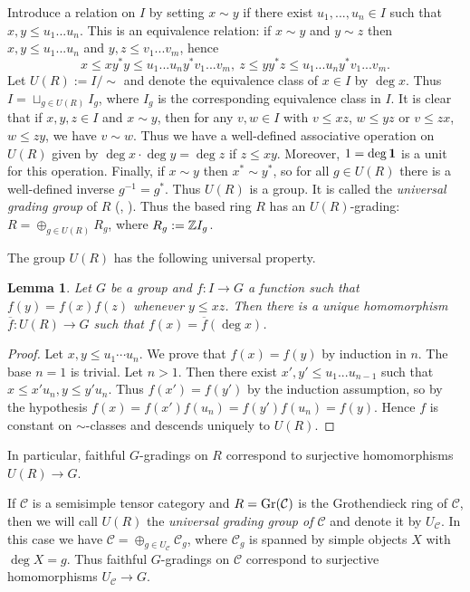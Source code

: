\documentclass[12pt]{amsart}
\numberwithin{equation}{section}
\newtheorem{lemma}[theorem]{Lemma}
\theoremstyle{definition}
\newcommand{\1}{_{(1)}}
\newcommand{\2}{_{(2)}}
\newcommand{\3}{_{(3)}}
\newcommand{\4}{_{(4)}}
\newcommand{\5}{_{(5)}}
\newcommand{\6}{_{(6)}}
\newcommand{\C}{\mathcal{C}}
\theoremstyle{plain}
\theoremstyle{definition}
\theoremstyle{remark}
\def\C{\mathcal{C}}
\begin{document}
Introduce a relation on $I$ by setting $x\sim y$ if there exist $u_1,...,u_n\in I$ such that $x,y\le u_1...u_n$. 
This is an equivalence relation: if $x\sim y$ and $y\sim z$ 
then $x,y\le u_1...u_n$ and $y,z\le v_1...v_m$, hence
$$
x\le xy^*y\le u_1...u_ny^*v_1...v_m,\ z\le yy^*z\le u_1...u_ny^*v_1...v_m.
$$
Let $U(R):=I/\sim$ and denote the equivalence class of $x\in I$ by $\deg x$. 
Thus $I=\sqcup_{g\in U(R)}I_g$, where $I_g$ is the corresponding equivalence class in $I$. It is clear that if $x,y,z\in I$ 
and $x\sim y$, then for any $v,w\in I$ with $v\le xz$, $w\le yz$ or $v\le zx$, $w\le zy$, we have $v\sim w$.
Thus we have a well-defined associative operation on $U(R)$ given by $\deg x\cdot \deg y=\deg z$ if $z\le xy$. Moreover, $1=\deg\bold 1$ is a unit for this operation. Finally, 
if $x\sim y$ then $x^*\sim y^*$, so for all $g\in U(R)$ there is a well-defined 
inverse $g^{-1}=g^*$. Thus $U(R)$ is a group. It is called the {\it universal grading group} of $R$
 (\cite[3.2]{GN}, \cite[Subsection 4.14]{EGNO}). Thus the based ring $R$ has an $U(R)$-grading: $R=\oplus_{g\in U(R)}R_g$, where $R_g:=\Bbb ZI_g$. 
 
The group $U(R)$ has the following universal property. 

\begin{lemma}\label{homom}  Let $G$ be a group and $f : I\to G$ a function 
such that $f(y)=f(x)f(z)$ whenever $y\le xz$. Then there is a unique homomorphism $\overline{f}: U(R)\to G$ such that $f(x)=\overline{f}(\deg x)$.
\end{lemma}

\begin{proof} Let $x,y\le u_1\cdots u_n$. We prove that $f(x)=f(y)$ by induction in $n$. 
The base $n=1$ is trivial. Let $n>1$. Then there exist $x',y'\le u_1...u_{n-1}$ such that $x\le x'u_n,y\le y'u_n$. 
Thus $f(x')=f(y')$ by the induction assumption, so by the hypothesis $f(x)=f(x')f(u_n)=f(y')f(u_n)=f(y)$. Hence $f$ is constant on $\sim$-classes and descends uniquely to $U(R)$.
\end{proof}

In particular, faithful $G$-gradings on $R$ correspond to surjective homomorphisms
$U(R)\to G$. 

If $\C$ is a semisimple tensor category and $R={\rm Gr}(\C)$ is the Grothendieck ring of $\C$, 
then we will call $U(R)$ the {\it universal grading group of $\C$} and denote it by $U_\C$. 
In this case we have $\C=\oplus_{g\in U_\C}\C_g$, where $\C_g$ is spanned by simple objects $X$ with 
$\deg X=g$. Thus faithful $G$-gradings on $\C$ correspond to surjective homomorphisms 
$U_\C\to G$. 
\end{document}
